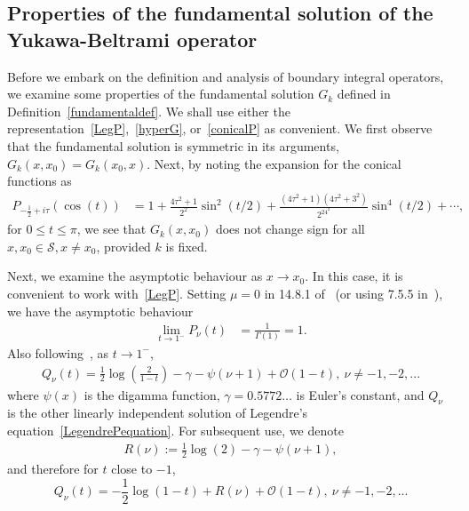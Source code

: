 \documentclass[final]{siamltex}
\renewcommand{\S} {\mathcal{S}}
\newcommand{\bigO} {\mathcal{O}}
\begin{document}
\subsection{Properties of the fundamental solution of the Yukawa-Beltrami operator}
Before we embark on the definition and analysis of boundary integral
operators, we examine some properties of the fundamental solution $G_k$
defined in Definition~\ref{fundamentaldef}. We shall use either the
representation~\eqref{LegP},~\eqref{hyperG}, or~\eqref{conicalP} as
convenient.  We first observe that the fundamental solution is
symmetric in its arguments, $G_k(x,x_{0}) = G_k(x_{0},x)$. Next, by
noting the expansion for the conical functions as~\cite{lebedev}
\begin{align*}
  P_{-\frac{1}{2}+i \tau} (\cos(t)) &= 1+
    \frac{4\tau^2+1}{2^2}\sin^2(t/2) + 
      \frac{(4\tau^2+1)(4\tau^2+3^2)}{2^24^2}\sin^4(t/2) + 
    \cdots,
\end{align*}
for $0\leq t\leq \pi$, we see that $G_k(x,x_0)$ does not change sign for
all $x,x_{0} \in \S, x \neq x_{0}$, provided $k$ is fixed.

Next, we examine the asymptotic behaviour as $x\rightarrow x_0$. In this
case, it is convenient to work with~\eqref{LegP}. Setting $\mu=0$ in
14.8.1 of~\cite{fatAbramowitz} (or using 7.5.5 in~\cite{lebedev}), we have the asymptotic behaviour
\begin{align} 
  \label{Pasymptotics}
  \lim_{t\rightarrow 1^- } P_\nu(t)&= \frac{1}{\Gamma(1)}=1.
\end{align}
Also following~\cite{fatAbramowitz}, as $t\rightarrow 1^{-}$,
\begin{align*}
  Q_{\nu}(t)=\frac{1}{2}\log\left(\frac{2}{1-t}\right)-\gamma
  -\psi(\nu+1)+\bigO(1-t),\: \nu \neq -1,-2,...
\end{align*} 
where $\psi(x)$ is the digamma function, $\gamma=0.5772\ldots$ is
Euler's constant, and $Q_{\nu}$ is the other linearly independent
solution of Legendre's equation~\eqref{LegendrePequation}.  For
subsequent use, we denote 
\begin{align*}
  R(\nu):= \frac{1}{2}\log(2) -\gamma -\psi(\nu+1), 
\end{align*}
and therefore for $t$ close to $-1$,
\begin{equation}
  \label{Qasymptotics}
  Q_{\nu}(t)=-\frac{1}{2}\log(1-t) + 
  R(\nu) + \bigO(1-t),\: \nu \neq -1,-2,... 
\end{equation}
\end{document}
